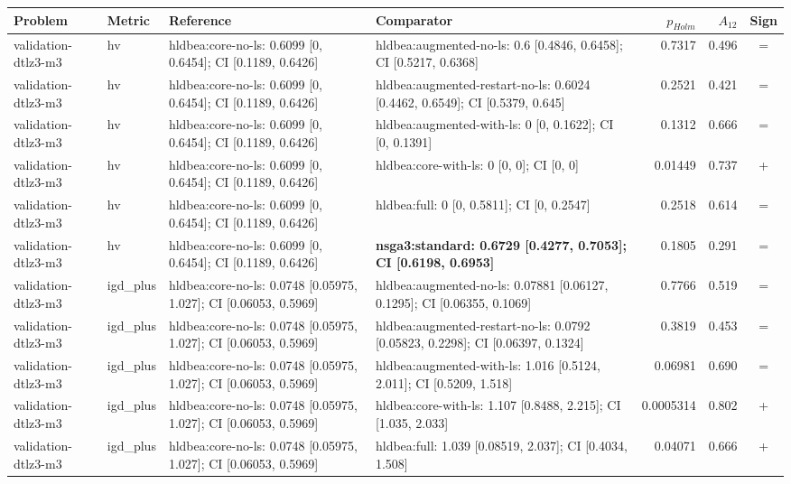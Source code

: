 \begin{tabular}{llllrrc}
\toprule
Problem & Metric & Reference & Comparator & $p_{Holm}$ & $A_{12}$ & Sign \\
\midrule
validation-dtlz3-m3 & hv & hldbea:core-no-ls: 0.6099 [0, 0.6454]; CI [0.1189, 0.6426] & hldbea:augmented-no-ls: 0.6 [0.4846, 0.6458]; CI [0.5217, 0.6368] & 0.7317 & 0.496 & = \\
validation-dtlz3-m3 & hv & hldbea:core-no-ls: 0.6099 [0, 0.6454]; CI [0.1189, 0.6426] & hldbea:augmented-restart-no-ls: 0.6024 [0.4462, 0.6549]; CI [0.5379, 0.645] & 0.2521 & 0.421 & = \\
validation-dtlz3-m3 & hv & hldbea:core-no-ls: 0.6099 [0, 0.6454]; CI [0.1189, 0.6426] & hldbea:augmented-with-ls: 0 [0, 0.1622]; CI [0, 0.1391] & 0.1312 & 0.666 & = \\
validation-dtlz3-m3 & hv & hldbea:core-no-ls: 0.6099 [0, 0.6454]; CI [0.1189, 0.6426] & hldbea:core-with-ls: 0 [0, 0]; CI [0, 0] & 0.01449 & 0.737 & + \\
validation-dtlz3-m3 & hv & hldbea:core-no-ls: 0.6099 [0, 0.6454]; CI [0.1189, 0.6426] & hldbea:full: 0 [0, 0.5811]; CI [0, 0.2547] & 0.2518 & 0.614 & = \\
validation-dtlz3-m3 & hv & hldbea:core-no-ls: 0.6099 [0, 0.6454]; CI [0.1189, 0.6426] & \textbf{nsga3:standard: 0.6729 [0.4277, 0.7053]; CI [0.6198, 0.6953]} & 0.1805 & 0.291 & = \\
validation-dtlz3-m3 & igd\_plus & hldbea:core-no-ls: 0.0748 [0.05975, 1.027]; CI [0.06053, 0.5969] & hldbea:augmented-no-ls: 0.07881 [0.06127, 0.1295]; CI [0.06355, 0.1069] & 0.7766 & 0.519 & = \\
validation-dtlz3-m3 & igd\_plus & hldbea:core-no-ls: 0.0748 [0.05975, 1.027]; CI [0.06053, 0.5969] & hldbea:augmented-restart-no-ls: 0.0792 [0.05823, 0.2298]; CI [0.06397, 0.1324] & 0.3819 & 0.453 & = \\
validation-dtlz3-m3 & igd\_plus & hldbea:core-no-ls: 0.0748 [0.05975, 1.027]; CI [0.06053, 0.5969] & hldbea:augmented-with-ls: 1.016 [0.5124, 2.011]; CI [0.5209, 1.518] & 0.06981 & 0.690 & = \\
validation-dtlz3-m3 & igd\_plus & hldbea:core-no-ls: 0.0748 [0.05975, 1.027]; CI [0.06053, 0.5969] & hldbea:core-with-ls: 1.107 [0.8488, 2.215]; CI [1.035, 2.033] & 0.0005314 & 0.802 & + \\
validation-dtlz3-m3 & igd\_plus & hldbea:core-no-ls: 0.0748 [0.05975, 1.027]; CI [0.06053, 0.5969] & hldbea:full: 1.039 [0.08519, 2.037]; CI [0.4034, 1.508] & 0.04071 & 0.666 & + \\

\end{tabular}
